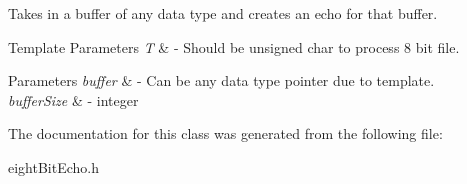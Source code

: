 Takes in a buffer of any data type and creates an echo for that buffer. 


\begin{DoxyTemplParams}{Template Parameters}
{\em T} & -\/ Should be unsigned char to process 8 bit file. \\
\hline
\end{DoxyTemplParams}

\begin{DoxyParams}{Parameters}
{\em buffer} & -\/ Can be any data type pointer due to template. \\
\hline
{\em buffer\+Size} & -\/ integer \\
\hline
\end{DoxyParams}


The documentation for this class was generated from the following file\+:\begin{DoxyCompactItemize}
\item 
eight\+Bit\+Echo.\+h\end{DoxyCompactItemize}
